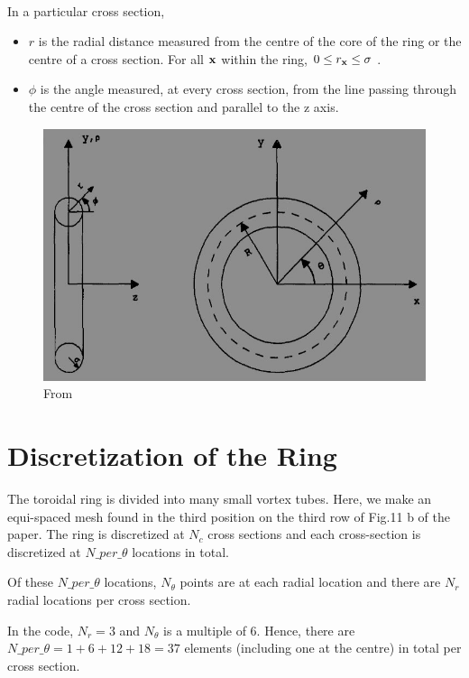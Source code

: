 \documentclass[10pt,a4paper]{report}
\newcommand{\xv}{{\bf x}}
\begin{document}
\paragraph{}
In a particular cross section,
\begin{itemize}
\item
$r$ is the radial distance measured from the centre of the core of the ring or the centre of a cross section. For all $\xv$ within the ring, $0 \leq r_\xv \leq \sigma $ . 
\item
$\phi$ is the angle measured, at every cross section, from the line passing through the centre of the cross section and parallel to the z axis.  
\end{itemize}
\begin{figure}
\includegraphics[scale=0.3]{axis.jpg}
\caption{From \cite{Ghoniem}}
\end{figure}

\section{Discretization of the Ring}

The toroidal ring is divided into many small vortex tubes. Here, we make an equi-spaced mesh found in the third position on the third row of Fig.11 b of the paper\cite{ghoniem}. The ring is discretized at $N_c$ cross sections and each cross-section is discretized at $N\_per\_ \theta$ locations in total.

Of these $N\_per\_ \theta$ locations, $N_\theta $ points are at each radial location and there are $N_r $ radial locations per cross section. 

In the code, $N_r = 3$ and $N_\theta $ is a multiple of 6. Hence, there are $ N\_per\_\theta = 1 + 6 + 12 + 18 = 37$ elements (including one at the centre) in total per cross section. 
\end{document}
